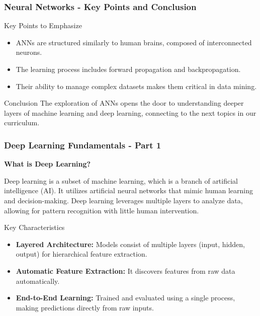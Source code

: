 \documentclass[aspectratio=169]{beamer}
\begin{document}
\begin{frame}[fragile]
    \frametitle{Neural Networks - Key Points and Conclusion}
    \begin{block}{Key Points to Emphasize}
        \begin{itemize}
            \item ANNs are structured similarly to human brains, composed of interconnected neurons.
            \item The learning process includes forward propagation and backpropagation.
            \item Their ability to manage complex datasets makes them critical in data mining.
        \end{itemize}
    \end{block}

    \begin{block}{Conclusion}
        The exploration of ANNs opens the door to understanding deeper layers of machine learning and deep learning, connecting to the next topics in our curriculum.
    \end{block}
\end{frame}

\begin{frame}[fragile]
    \frametitle{Deep Learning Fundamentals - Part 1}
    \textbf{What is Deep Learning?}
    
    Deep learning is a subset of machine learning, which is a branch of artificial intelligence (AI). It utilizes artificial neural networks that mimic human learning and decision-making. Deep learning leverages multiple layers to analyze data, allowing for pattern recognition with little human intervention.

    \begin{block}{Key Characteristics}
        \begin{itemize}
            \item \textbf{Layered Architecture:} Models consist of multiple layers (input, hidden, output) for hierarchical feature extraction.
            \item \textbf{Automatic Feature Extraction:} It discovers features from raw data automatically.
            \item \textbf{End-to-End Learning:} Trained and evaluated using a single process, making predictions directly from raw inputs.
        \end{itemize}
    \end{block}
\end{frame}
\end{document}
